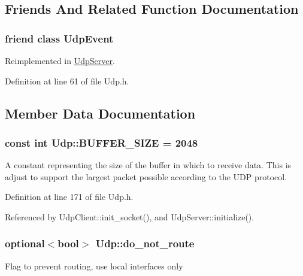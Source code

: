 \subsection{Friends And Related Function Documentation}
\hypertarget{classUdp_aa3db591e179836aff8d4a6d952d43101}{
\subsubsection[{UdpEvent}]{\setlength{\rightskip}{0pt plus 5cm}friend class {\bf UdpEvent}}}
\label{classUdp_aa3db591e179836aff8d4a6d952d43101}


Reimplemented in \hyperlink{classUdpServer_aa3db591e179836aff8d4a6d952d43101}{UdpServer}.



Definition at line 61 of file Udp.h.



\subsection{Member Data Documentation}
\hypertarget{classUdp_aa72dc03ed420eee2098841f5998e3c53}{
\subsubsection[{BUFFER\_\-SIZE}]{\setlength{\rightskip}{0pt plus 5cm}const int {\bf Udp::BUFFER\_\-SIZE} = 2048}}
\label{classUdp_aa72dc03ed420eee2098841f5998e3c53}
A constant representing the size of the buffer in which to receive data. This is adjust to support the largest packet possible according to the UDP protocol. 

Definition at line 171 of file Udp.h.



Referenced by UdpClient::init\_\-socket(), and UdpServer::initialize().

\hypertarget{classUdp_ace1cbe1cd248a6ae689848f25c26d9d1}{
\subsubsection[{do\_\-not\_\-route}]{\setlength{\rightskip}{0pt plus 5cm}optional$<$bool$>$ {\bf Udp::do\_\-not\_\-route}}}
\label{classUdp_ace1cbe1cd248a6ae689848f25c26d9d1}
Flag to prevent routing, use local interfaces only 

